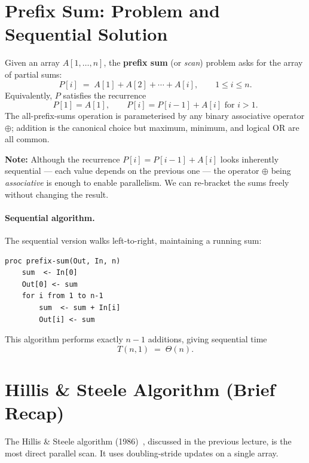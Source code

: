\section{Prefix Sum: Problem and Sequential Solution}
\label{sec:prefix-sum-problem}

Given an array $A[1,\ldots,n]$, the \textbf{prefix sum} (or \emph{scan})
problem asks for the array of partial sums:
\[
P[i] \;=\; A[1] + A[2] + \cdots + A[i], \qquad 1 \le i \le n.
\]
Equivalently, $P$ satisfies the recurrence
\[
P[1] = A[1], \qquad P[i] = P[i-1] + A[i] \text{ for } i > 1.
\]
The all-prefix-sums operation is parameterised by any binary associative
operator $\oplus$; addition is the canonical choice but maximum, minimum,
and logical OR are all common.

\begin{ppnote}
\textbf{Note:} Although the recurrence $P[i] = P[i-1] + A[i]$ looks
inherently sequential --- each value depends on the previous one --- the
operator $\oplus$ being \emph{associative} is enough to enable
parallelism. We can re-bracket the sums freely without changing the result.
\end{ppnote}

\paragraph{Sequential algorithm.}
The sequential version walks left-to-right, maintaining a running sum:

\begin{lstlisting}[caption={Sequential prefix sum (vector form)}]
proc prefix-sum(Out, In, n)
    sum  <- In[0]
    Out[0] <- sum
    for i from 1 to n-1
        sum  <- sum + In[i]
        Out[i] <- sum
\end{lstlisting}

This algorithm performs exactly $n-1$ additions, giving sequential time
\[
T(n,1) \;=\; \Theta(n).
\]

\section{Hillis \& Steele Algorithm (Brief Recap)}
\label{sec:hillis-steele}

The Hillis \& Steele algorithm (1986)~\cite{hillis1986}, discussed in the previous lecture,
is the most direct parallel scan. It uses doubling-stride updates on a
single array.

